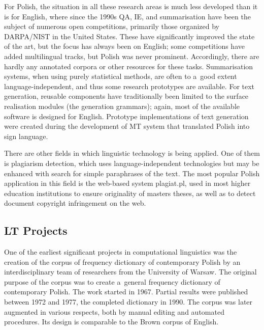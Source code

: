 \begin{multicols}{2}

For Polish, the situation in all these research areas is much less
developed than it is for English, where since the 1990s QA, IE, and
summarisation have been the subject of numerous open competitions,
primarily those organized by DARPA/NIST in the United States. These
have significantly improved the state of the art, but the focus has
always been on English; some competitions have added multilingual
tracks, but Polish was never prominent. Accordingly, there are hardly
any annotated corpora or other resources for these tasks.
Summarisation systems, when using purely statistical methods, are
often to a~good extent language-independent, and thus some research
prototypes are available. For text generation, reusable components
have traditionally been limited to the surface realisation modules
(the {\textquotedbl}generation grammars{\textquotedbl}); again, most
of the available software is designed for English. Prototype
implementations of text generation were created during the development
of MT system that translated Polish into sign language. 

There are other fields in which linguistic technology is being
applied. One of them is plagiarism detection, which uses
language-independent technologies but may be enhanced with search for
simple paraphrases of the text. The most popular Polish application in
this field is the web-based system plagiat.pl, used in most higher
education institutions to ensure originality of
master{\textquotesingle}s theses, as well as to detect document
copyright infringement on the web. 

\vfill

\subsection[LT Projects]{LT Projects} 

One of the earliest significant projects in computational linguistics
was the creation of the corpus of frequency dictionary of contemporary
Polish by an interdisciplinary team of researchers from the University
of Warsaw. The original purpose of the corpus was to create a~general
frequency dictionary of contemporary Polish. The work started in 1967.
Partial results were published between 1972 and 1977, the completed
dictionary in 1990. The corpus was later augmented in various
respects, both by manual editing and automated procedures. Its design
is comparable to the Brown corpus of English. 


\end{multicols}
